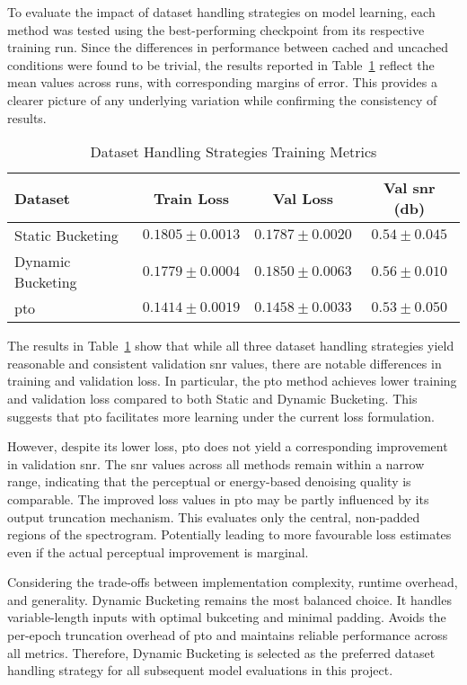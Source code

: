 To evaluate the impact of dataset handling strategies on model learning, each method was tested using the best-performing checkpoint from its respective training run. Since the differences in performance between cached and uncached conditions were found to be trivial, the results reported in Table~\ref{tab:dataset_performance} reflect the mean values across runs, with corresponding margins of error. This provides a clearer picture of any underlying variation while confirming the consistency of results.

\vspace{1em}
\begin{table}[H]
\centering
\caption{Dataset Handling Strategies Training Metrics}
\label{tab:dataset_performance}
\begin{tabular}{|l|c|c|c|}
\hline
\textbf{Dataset} & \textbf{Train Loss} & \textbf{Val Loss} & \textbf{Val \gls{snr} (db)} \\
\hline
Static Bucketing  & \(0.1805 \pm 0.0013\)  & \(0.1787 \pm 0.0020\)  & \(0.54 \pm 0.045\) \\
Dynamic Bucketing & \(0.1779 \pm 0.0004\)  & \(0.1850 \pm 0.0063\)  & \(0.56 \pm 0.010\) \\
\gls{pto}               & \(0.1414 \pm 0.0019\)  & \(0.1458 \pm 0.0033\)  & \(0.53 \pm 0.050\) \\
\hline
\end{tabular}
\end{table}

The results in Table~\ref{tab:dataset_performance} show that while all three dataset handling strategies yield reasonable and consistent validation \gls{snr} values, there are notable differences in training and validation loss. In particular, the \gls{pto} method achieves lower training and validation loss compared to both Static and Dynamic Bucketing. This suggests that \gls{pto} facilitates more learning under the current loss formulation.

However, despite its lower loss, \gls{pto} does not yield a corresponding improvement in validation \gls{snr}. The \gls{snr} values across all methods remain within a narrow range, indicating that the perceptual or energy-based denoising quality is comparable. The improved loss values in \gls{pto} may be partly influenced by its output truncation mechanism. This evaluates only the central, non-padded regions of the spectrogram. Potentially leading to more favourable loss estimates even if the actual perceptual improvement is marginal.

Considering the trade-offs between implementation complexity, runtime overhead, and generality. Dynamic Bucketing remains the most balanced choice. It handles variable-length inputs with optimal bukceting and minimal padding. Avoids the per-epoch truncation overhead of \gls{pto} and maintains reliable performance across all metrics. Therefore, Dynamic Bucketing is selected as the preferred dataset handling strategy for all subsequent model evaluations in this project.

